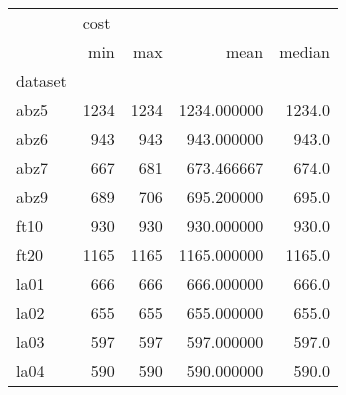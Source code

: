 \begin{tabular}{lrrrr}
\toprule
{} & \multicolumn{4}{l}{cost} \\
{} &   min &   max &         mean &  median \\
dataset &       &       &              &         \\
\midrule
abz5    &  1234 &  1234 &  1234.000000 &  1234.0 \\
abz6    &   943 &   943 &   943.000000 &   943.0 \\
abz7    &   667 &   681 &   673.466667 &   674.0 \\
abz9    &   689 &   706 &   695.200000 &   695.0 \\
ft10    &   930 &   930 &   930.000000 &   930.0 \\
ft20    &  1165 &  1165 &  1165.000000 &  1165.0 \\
la01    &   666 &   666 &   666.000000 &   666.0 \\
la02    &   655 &   655 &   655.000000 &   655.0 \\
la03    &   597 &   597 &   597.000000 &   597.0 \\
la04    &   590 &   590 &   590.000000 &   590.0 \\
\bottomrule
\end{tabular}
